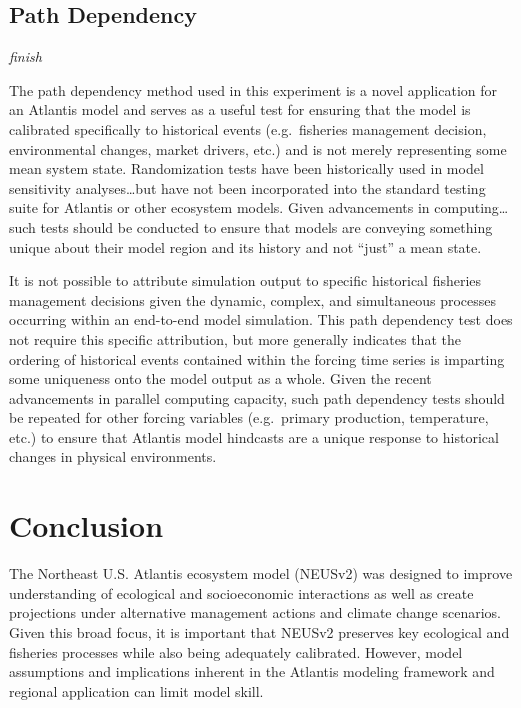 \documentclass[
]{article}
\begin{document}
\subsection{Path Dependency}\label{path-dependency}

\emph{finish}

The path dependency method used in this experiment is a novel application for an Atlantis model and serves as a useful test for ensuring that the model is calibrated specifically to historical events (e.g.~fisheries management decision, environmental changes, market drivers, etc.) and is not merely representing some mean system state. Randomization tests have been historically used in model sensitivity analyses\ldots but have not been incorporated into the standard testing suite for Atlantis or other ecosystem models. Given advancements in computing\ldots{} such tests should be conducted to ensure that models are conveying something unique about their model region and its history and not ``just'' a mean state.

It is not possible to attribute simulation output to specific historical fisheries management decisions given the dynamic, complex, and simultaneous processes occurring within an end-to-end model simulation. This path dependency test does not require this specific attribution, but more generally indicates that the ordering of historical events contained within the forcing time series is imparting some uniqueness onto the model output as a whole. Given the recent advancements in parallel computing capacity, such path dependency tests should be repeated for other forcing variables (e.g.~primary production, temperature, etc.) to ensure that Atlantis model hindcasts are a unique response to historical changes in physical environments.

\section{Conclusion}\label{conclusion}

The Northeast U.S. Atlantis ecosystem model (NEUSv2) was designed to improve understanding of ecological and socioeconomic interactions as well as create projections under alternative management actions and climate change scenarios. Given this broad focus, it is important that NEUSv2 preserves key ecological and fisheries processes while also being adequately calibrated. However, model assumptions and implications inherent in the Atlantis modeling framework and regional application can limit model skill.
\end{document}
